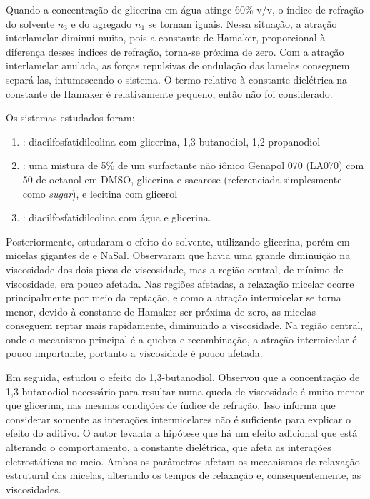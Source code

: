 		Quando a concentração de glicerina em água atinge 60\% v/v, o índice de refração do solvente \(n_3\) e do agregado \(n_1\) se tornam iguais. Nessa situação, a atração interlamelar diminui muito, pois a constante de Hamaker, proporcional à diferença desses índices de refração, torna-se próxima de zero. Com a atração interlamelar anulada, as forças repulsivas de ondulação das lamelas conseguem separá-las, intumescendo o sistema. O termo relativo à constante dielétrica na constante de Hamaker é relativamente pequeno, então não foi considerado.
		
		Os sistemas estudados foram: 
		
		\begin{enumerate}[noitemsep]
			\item \citeauthor{Grabner2014}: diacilfosfatidilcolina com glicerina, 1,3-butanodiol, 1,2-propanodiol
			\item \citeauthor{Song2008a}: uma mistura de 5\% de um surfactante não iônico Genapol 070 (LA070) com 50\mM{} de octanol em DMSO, glicerina e sacarose (referenciada simplesmente como \emph{sugar}), e lecitina com glicerol
			\item \citeauthor{Shinto2012}: diacilfosfatidilcolina com água e glicerina.
		\end{enumerate}
		
		
		
		Posteriormente, \citeauthor{Hoffmann2010} estudaram o efeito do solvente, utilizando glicerina, porém em micelas gigantes de \CTAB{} e NaSal. Observaram que havia uma grande diminuição na viscosidade dos dois picos de viscosidade, mas a região central, de mínimo de viscosidade, era pouco afetada. Nas regiões afetadas, a relaxação micelar ocorre principalmente por meio da reptação, e como a atração intermicelar se torna menor, devido à constante de Hamaker ser próxima de zero, as micelas conseguem reptar mais rapidamente, diminuindo a viscosidade. Na região central, onde o mecanismo principal é a quebra e recombinação, a atração intermicelar é pouco importante, portanto a viscosidade é pouco afetada.%
		
		Em seguida, \citeauthor{Abdel-Rahem2014} estudou o efeito do 1,3-butanodiol. Observou que a concentração de 1,3-butanodiol necessário para resultar numa queda de viscosidade é muito menor que glicerina, nas mesmas condições de índice de refração. Isso informa que considerar somente as interações intermicelares não é suficiente para explicar o efeito do aditivo. O autor levanta a hipótese que há um efeito adicional que está alterando o comportamento, a constante dielétrica, que afeta as interações eletrostáticas no meio. Ambos os parâmetros afetam os mecanismos de relaxação estrutural das micelas, alterando os tempos de relaxação e, consequentemente, as viscosidades. 
		
